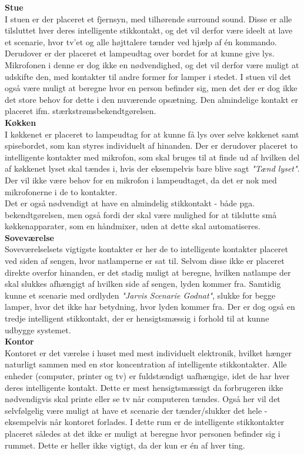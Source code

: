 {\bf Stue}\\
I stuen er der placeret et fjernsyn, med tilhørende surround sound. Disse er alle tilsluttet hver deres intelligente stikkontakt, og det vil derfor være ideelt at lave et scenarie, hvor tv'et og alle højttalere tænder ved hjælp af én kommando. Derudover er der placeret et lampeudtag over bordet for at kunne give lys. Mikrofonen i denne er dog ikke en nødvendighed, og det vil derfor være muligt at udskifte den, med kontakter til andre former for lamper i stedet. I stuen vil det også være muligt at beregne hvor en person befinder sig, men det der er dog ikke det store behov for dette i den nuværende opsætning. Den almindelige kontakt er placeret ifm. stærkstrømsbekendtgørelsen. \\

{\bf Køkken}\\
I køkkenet er placeret to lampeudtag for at kunne få lys over selve køkkenet samt spisebordet, som kan styres individuelt af hinanden. Der er derudover placeret to intelligente kontakter med mikrofon, som skal bruges til at finde ud af hvilken del af køkkenet lyset skal tændes i, hvis der eksempelvis bare blive sagt \textit{"Tænd lyset"}. Der vil ikke være behov for en mikrofon i lampeudtaget, da det er nok med mikrofonerne i de to kontakter.\\Det er også nødvendigt at have en almindelig stikkontakt - både pga. bekendtgørelsen, men også fordi der skal være mulighed for at tilslutte små køkkenapparater, som en håndmixer, uden at dette skal automatiseres. \\

{\bf Soveværelse}\\
Soveværelselsets vigtigste kontakter er her de to intelligente kontakter placeret ved siden af sengen, hvor natlamperne er sat til. Selvom disse ikke er placeret direkte overfor hinanden, er det stadig muligt at beregne, hvilken natlampe der skal slukkes afhængigt af hvilken side af sengen, lyden kommer fra. Samtidig kunne et scenarie med ordlyden \textit{"Jarvis Scenarie Godnat"}, slukke for begge lamper, hvor det ikke har betydning, hvor lyden kommer fra. Der er dog også en tredje intelligent stikkontakt, der er hensigtsmæssig i forhold til at kunne udbygge systemet. \\

{\bf Kontor}\\
Kontoret er det værelse i huset med mest individuelt elektronik, hvilket hænger naturligt sammen med en stor koncentration af intelligente stikkontakter. Alle enheder (computer, printer og tv) er fuldstændigt uafhængige, idet de har hver deres intelligente kontakt. Dette er mest hensigtsmæssigt da forbrugeren ikke nødvendigvis skal printe eller se tv når computeren tændes. Også her vil det selvfølgelig være muligt at have et scenarie der tænder/slukker det hele - eksempelvis når kontoret forlades. I dette rum er de intelligente stikkontakter placeret således at det ikke er muligt at beregne hvor personen befinder sig i rummet. Dette er heller ikke vigtigt, da der kun er én af hver ting. \\

